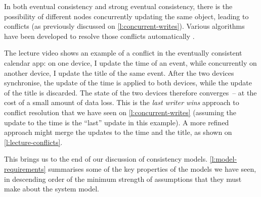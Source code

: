 In both eventual consistency and strong eventual consistency, there is the possibility of different nodes concurrently updating the same object, leading to conflicts (as previously discussed on \autoref{l:concurrent-writes}).
Various algorithms have been developed to resolve those conflicts automatically \citep{Shapiro:2011}.

The lecture video shows an example of a conflict in the eventually consistent calendar app: on one device, I update the time of an event, while concurrently on another device, I update the title of the same event.
After the two devices synchronise, the update of the time is applied to both devices, while the update of the title is discarded.
The state of the two devices therefore converges~-- at the cost of a small amount of data loss.
This is the \emph{last writer wins} approach to conflict resolution that we have seen on \autoref{l:concurrent-writes} (assuming the update to the time is the ``last'' update in this example).
A more refined approach might merge the updates to the time and the title, as shown on \autoref{l:lecture-conflicts}.

This brings us to the end of our discussion of consistency models.
\autoref{l:model-requirements} summarises some of the key properties of the models we have seen, in descending order of the minimum strength of assumptions that they must make about the system model.

